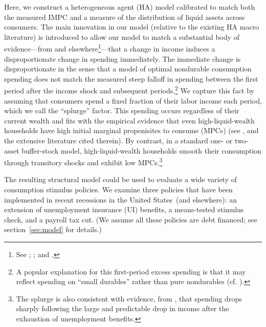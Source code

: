 \documentclass[\econtexRoot/HAFiscal]{subfiles}
\begin{document}
Here, we construct a heterogeneous agent (HA) model calibrated to match both the measured IMPC and a measure of the distribution of liquid assets across consumers.  The main innovation in our model (relative to the existing HA macro literature) is introduced to allow our model to match a substantial body of evidence---from \cite{fagereng_mpc_2021} and elsewhere\footnote{See \cite{parker2013consumer}; \cite{ganongConsumer2019}; and \cite{olafsson2018liquid}.}---that a change in income induces a disproportionate change in spending immediately.  The immediate change is disproportionate in the sense that a model of optimal nondurable consumption spending does not match the measured steep falloff in spending between the first period after the income shock and subsequent periods.\footnote{A popular explanation for this first-period excess spending is that it may reflect spending on ``small durables'' rather than pure nondurables (cf. \cite{laibson2022simple}).}  We capture this fact by assuming that consumers spend a fixed fraction of their labor income each period, which we call the ``splurge'' factor. This spending occurs regardless of their current wealth and fits with the empirical evidence that even high-liquid-wealth households have high initial marginal propenisites to consume (MPCs) (see \cite{crawleyMicroMacro}, and the extensive literature cited therein).  By contrast, in a standard one- or two-asset buffer-stock model, high-liquid-wealth households smooth their consumption through transitory shocks and exhibit low MPCs.\footnote{The splurge is also consistent with evidence, from \cite{ganongConsumer2019}, that spending drops sharply following the large and predictable drop in income after the exhaustion of unemployment benefits.}

The resulting structural model could be used to evaluate a wide variety of consumption stimulus policies.  We examine three policies that have been implemented in recent recessions in the United States\ (and elsewhere): an extension of unemployment insurance (UI) benefits, a means-tested stimulus check, and a payroll tax cut.  (We assume all these policies are debt financed; see section~\ref{sec:model} for details.)  %
\end{document}

